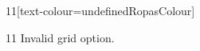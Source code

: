 \documentclass[paper=A4]{ropas-poster}
\begin{document}
\begin{postergrid}{1}{1}[text-colour=undefinedRopasColour]
\begin{posterblock}{1}{1}
Invalid grid option.
\end{posterblock}
\end{postergrid}
\end{document}
